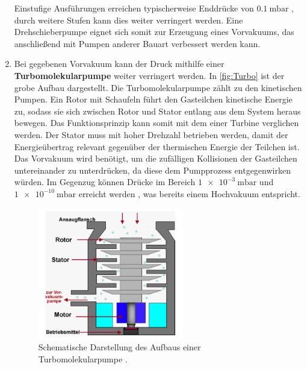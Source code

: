 \begin{enumerate}
    Einstufige Ausführungen erreichen typischerweise Enddrücke von $\qty{0.1}{\milli\bar}$ \cite{Pfeiffer_Drehschieberpumpe}, durch weitere Stufen kann dies weiter verringert werden.
    Eine Drehschieberpumpe eignet sich somit zur Erzeugung eines Vorvakuums, das anschließend mit Pumpen anderer Bauart verbessert werden kann.
    \item Bei gegebenen Vorvakuum kann der Druck mithilfe einer \textbf{Turbomolekularpumpe} weiter verringert werden.
    In \autoref{fig:Turbo} ist der grobe Aufbau dargestellt.
    Die Turbomolekularpumpe zählt zu den kinetischen Pumpen. Ein Rotor mit Schaufeln führt den Gasteilchen kinetische Energie zu, sodass sie
    sich zwischen Rotor und Stator entlang aus dem System heraus bewegen. Das Funktionsprinzip kann somit mit dem einer Turbine verglichen werden. Der
    Stator muss mit hoher Drehzahl betrieben werden, damit der Energieübertrag relevant gegenüber der thermischen Energie der Teilchen ist.
    Das Vorvakuum wird benötigt, um die zufälligen Kollisionen der Gasteilchen untereinander zu unterdrücken, da diese dem Pumpprozess entgegenwirken
    würden. Im Gegenzug können Drücke im Bereich $\qty{1e-3}{\milli\bar}$ und $\qty{1e-10}{\milli\bar}$ erreicht werden \cite{Pfeiffer_Turbomolekularpumpen},
    was bereits einem Hochvakuum entspricht.
    \begin{figure}[H]
        \centering
        \includegraphics[width=0.6\textwidth]{content/pics/turbo.png}
        \caption{Schematische Darstellung des Aufbaus einer Turbomolekularpumpe \cite{Turbopumpe}.}
        \label{fig:Turbo}
    \end{figure}
\end{enumerate}

